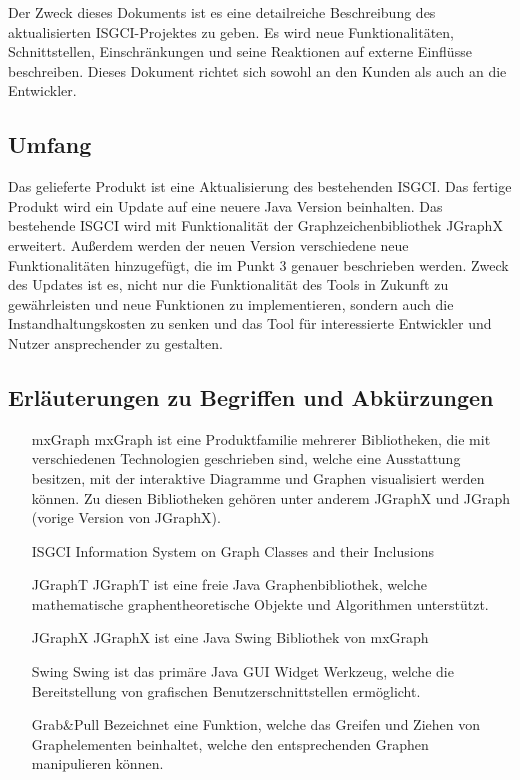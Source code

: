 \documentclass[11pt,a4paper]{article}
\begin{document}
	Der Zweck dieses Dokuments ist es eine detailreiche Beschreibung des aktualisierten ISGCI-Projektes zu geben. Es wird neue Funktionalitäten, Schnittstellen, Einschränkungen und seine Reaktionen auf externe Einflüsse beschreiben. Dieses Dokument richtet sich sowohl an den Kunden als auch an die Entwickler.
	

  	\subsection{Umfang} %
   Das gelieferte Produkt ist eine Aktualisierung des bestehenden ISGCI. Das fertige Produkt wird ein Update auf eine neuere Java Version beinhalten. Das bestehende ISGCI wird mit Funktionalität der Graphzeichenbibliothek JGraphX erweitert. Außerdem werden der neuen Version verschiedene neue Funktionalitäten hinzugefügt, die im Punkt 3 genauer beschrieben werden. Zweck des Updates ist es, nicht nur die Funktionalität des Tools in Zukunft zu gewährleisten und neue Funktionen zu implementieren, sondern auch die Instandhaltungskosten zu senken und das Tool für interessierte Entwickler und Nutzer ansprechender zu gestalten.

  	\subsection{Erläuterungen zu Begriffen und Abkürzungen} %

	        \begin{itemize}
	        \item[mxGraph] mxGraph ist eine Produktfamilie mehrerer Bibliotheken, die mit verschiedenen Technologien geschrieben sind, welche eine Ausstattung besitzen, mit der interaktive Diagramme und Graphen visualisiert werden können. Zu diesen Bibliotheken gehören unter anderem JGraphX und JGraph (vorige Version von JGraphX).
	        \item[ISGCI] Information System on Graph Classes and their Inclusions
	        \item[JGraphT] JGraphT ist eine freie Java Graphenbibliothek, welche mathematische graphentheoretische Objekte und Algorithmen unterstützt. 
	        \item[JGraphX] JGraphX ist eine Java Swing Bibliothek von mxGraph
	        \item[Swing] Swing ist das primäre Java GUI Widget Werkzeug, welche die Bereitstellung von grafischen Benutzerschnittstellen ermöglicht.
	        \item[Grab\&Pull] Bezeichnet eine Funktion, welche das Greifen und Ziehen von Graphelementen beinhaltet, welche den entsprechenden Graphen manipulieren können.
	        \end{itemize}
	        
\end{document}
